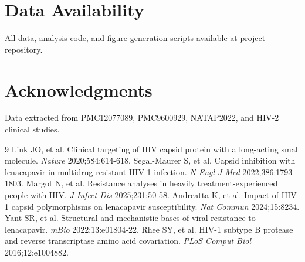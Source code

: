 \documentclass[preprint]{elsarticle}
\begin{document}
\section*{Data Availability}
All data, analysis code, and figure generation scripts available at project repository.

\section*{Acknowledgments}
Data extracted from PMC12077089, PMC9600929, NATAP2022, and HIV-2 clinical studies.

\begin{thebibliography}{9}
 Link JO, et al. Clinical targeting of HIV capsid protein with a long-acting small molecule. \textit{Nature} 2020;584:614-618.
 Segal-Maurer S, et al. Capsid inhibition with lenacapavir in multidrug-resistant HIV-1 infection. \textit{N Engl J Med} 2022;386:1793-1803.
 Margot N, et al. Resistance analyses in heavily treatment-experienced people with HIV. \textit{J Infect Dis} 2025;231:50-58.
 Andreatta K, et al. Impact of HIV-1 capsid polymorphisms on lenacapavir susceptibility. \textit{Nat Commun} 2024;15:8234.
 Yant SR, et al. Structural and mechanistic bases of viral resistance to lenacapavir. \textit{mBio} 2022;13:e01804-22.
 Rhee SY, et al. HIV-1 subtype B protease and reverse transcriptase amino acid covariation. \textit{PLoS Comput Biol} 2016;12:e1004882.
\end{thebibliography}
\end{document}
